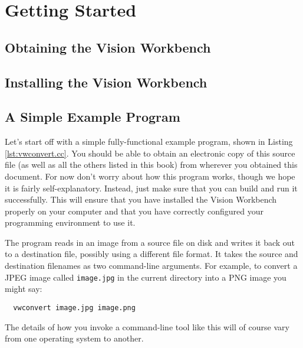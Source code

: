 \chapter{Getting Started}

\section{Obtaining the Vision Workbench}

\section{Installing the Vision Workbench}

\section{A Simple Example Program}

Let's start off with a simple fully-functional example program, shown
in Listing \ref{lst:vwconvert.cc}.  You should be able to obtain an
electronic copy of this source file (as well as all the others listed
in this book) from wherever you obtained this document.  For now don't
worry about how this program works, though we hope it is fairly
self-explanatory.  Instead, just make sure that you can build and run
it successfully.  This will ensure that you have installed the Vision
Workbench properly on your computer and that you have correctly
configured your programming environment to use it.


The program reads in an image from a source file on disk and writes it 
back out to a destination file, possibly using a different file format.  
It takes the source and destination filenames as two command-line arguments.  
For example, to convert a JPEG image called \verb#image.jpg# in the current 
directory into a PNG image you might say:
\begin{verbatim}
  vwconvert image.jpg image.png
\end{verbatim}
The details of how you invoke a command-line tool like this will of 
course vary from one operating system to another.
